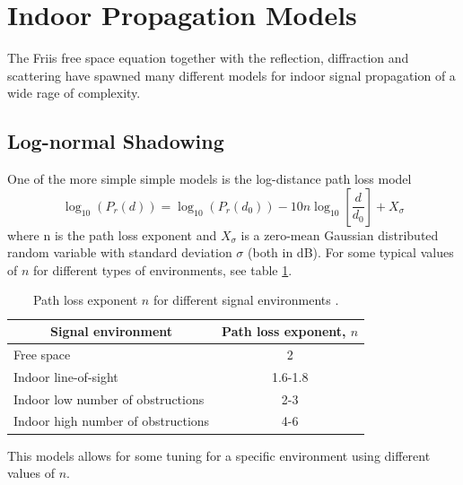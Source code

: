 \documentclass{LTHthesis}
\begin{document}
\section{Indoor Propagation Models}
%
The Friis free space equation together with the reflection, diffraction and scattering have spawned many different models for indoor signal propagation of a wide rage of complexity.
%
\subsection{Log-normal Shadowing} 
One of the more simple simple models is the log-distance path loss model
%
\begin{equation}
\log_{10}({P_r(d)})=\log_{10}({P_r(d_0)})-10n\log_{10}\left[{\frac{d}{d_0}}\right] + X_\sigma
\end{equation} 
%
where n is the path loss exponent and  $X_\sigma$ is a zero-mean Gaussian distributed random variable with standard deviation $\sigma$ (both in dB). For some typical values of $n$ for different types of environments, see table \ref{table:path_loss_n}.
%
\begin{table}
\begin{center}
\begin{tabular}{|l|c|}
\hline
\multicolumn{1}{|c|}{Signal environment} & Path loss exponent, $n$ \\
\hline
\hline
Free space & 2 \\
\hline
Indoor line-of-sight & 1.6-1.8 \\
\hline
Indoor low number of obstructions & 2-3 \\
\hline
Indoor high number of obstructions & 4-6 \\
\hline
\end{tabular}
\end{center}
\caption{Path loss exponent $n$ for different signal environments \cite{rappaport96}.}
\label{table:path_loss_n}
\end{table}
%
This models allows for some tuning for a specific environment using different values of $n$.
\end{document}
